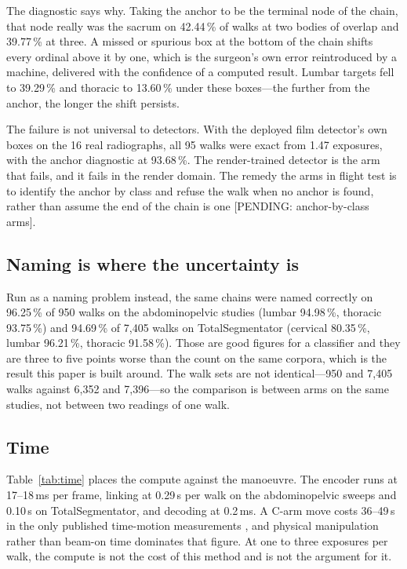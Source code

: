 \documentclass[11pt,letterpaper]{article}
\begin{document}
The diagnostic says why. Taking the anchor to be the terminal node of the chain, that node really was the
sacrum on 42.44\,\% of walks at two bodies of overlap and 39.77\,\% at three. A missed or spurious box at
the bottom of the chain shifts every ordinal above it by one, which is the surgeon's own error
reintroduced by a machine, delivered with the confidence of a computed result. Lumbar targets fell to
39.29\,\% and thoracic to 13.60\,\% under these boxes---the further from the anchor, the longer the shift
persists.

The failure is not universal to detectors. With the deployed film detector's own boxes on the 16 real
radiographs, all 95 walks were exact from 1.47 exposures, with the anchor diagnostic at 93.68\,\%. The
render-trained detector is the arm that fails, and it fails in the render domain. The remedy the arms
in flight test is to identify the anchor by class and refuse the walk when no anchor is found, rather than
assume the end of the chain is one [PENDING: anchor-by-class arms].

\subsection*{Naming is where the uncertainty is}
Run as a naming problem instead, the same chains were named correctly on 96.25\,\% of 950 walks on the
abdominopelvic studies (lumbar 94.98\,\%, thoracic 93.75\,\%) and 94.69\,\% of 7{,}405 walks on
TotalSegmentator (cervical 80.35\,\%, lumbar 96.21\,\%, thoracic 91.58\,\%). Those are good figures for a
classifier and they are three to five points worse than the count on the same corpora, which is the result
this paper is built around. The walk sets are not identical---950 and 7{,}405 walks against 6{,}352 and
7{,}396---so the comparison is between arms on the same studies, not between two readings of one walk.

\subsection*{Time}
Table~\ref{tab:time} places the compute against the manoeuvre. The encoder runs at 17--18\,ms per frame,
linking at 0.29\,s per walk on the abdominopelvic sweeps and 0.10\,s on TotalSegmentator, and decoding at
0.2\,ms. A C-arm move costs 36--49\,s in the only published time-motion measurements
\citep{matthews2007,desilva2018}, and physical manipulation rather than beam-on time dominates that
figure. At one to three exposures per walk, the compute is not the cost of this method and is not the
argument for it.
\end{document}
